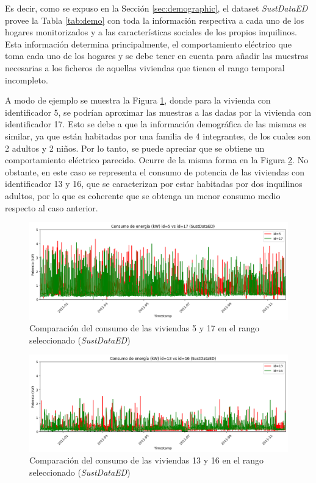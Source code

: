 \vspace{3mm}

Es decir, como se expuso en la Sección \ref{sec:demographic}, el dataset \textit{SustDataED} provee la Tabla \ref{tab:demo} con toda la información respectiva a cada uno de los hogares monitorizados y a las características sociales de los propios inquilinos. Esta información determina principalmente, el comportamiento eléctrico que toma cada uno de los hogares y se debe tener en cuenta para añadir las muestras necesarias a los ficheros de aquellas viviendas que tienen el rango temporal incompleto. 

\vspace{3mm}

A modo de ejemplo se muestra la Figura \ref{fig:517}, donde para la vivienda con identificador 5, se podrían aproximar las muestras a las dadas por la vivienda con identificador 17. Esto se debe a que la información demográfica de las mismas es similar, ya que están habitadas por una familia de 4 integrantes, de los cuales son 2 adultos y 2 niños. Por lo tanto, se puede apreciar que se obtiene un comportamiento eléctrico parecido. Ocurre de la misma forma en la Figura \ref{fig:1316}. No obstante, en este caso se representa el consumo de potencia de las viviendas con identificador 13 y 16, que se caracterizan por estar habitadas por dos inquilinos adultos, por lo que es coherente que se obtenga un menor consumo medio respecto al caso anterior.

\vspace{3mm}

\begin{figure}[h!]
  \centering
  \includegraphics[width=1\textwidth]{img/diseno/517.png}
  \caption{Comparación del consumo de las viviendas 5 y 17 en el rango seleccionado (\textit{SustDataED})}
  \label{fig:517}
\end{figure}

\begin{figure}[H]
  \centering
  \includegraphics[width=1\textwidth]{img/diseno/1316.png}
  \caption{Comparación del consumo de las viviendas 13 y 16 en el rango seleccionado (\textit{SustDataED})}
  \label{fig:1316}
\end{figure}

